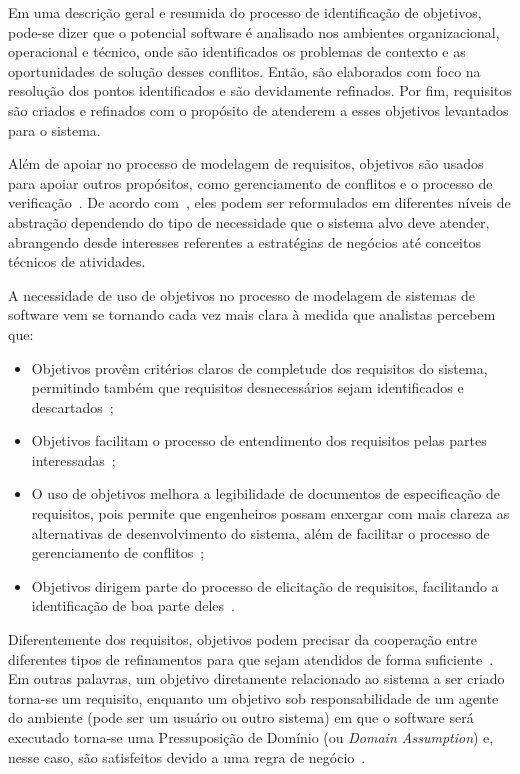 Em uma descrição geral e resumida do processo de identificação de objetivos, pode-se dizer que o potencial software é analisado nos ambientes organizacional, operacional e técnico, onde são identificados os problemas de contexto e as oportunidades de solução desses conflitos. Então, são elaborados com foco na resolução dos pontos identificados e são devidamente refinados. Por fim, requisitos são criados e refinados com o propósito de atenderem a esses objetivos levantados para o sistema. 


Além de apoiar no processo de modelagem de requisitos, objetivos são usados para apoiar outros propósitos, como gerenciamento de conflitos e o processo de verificação~\cite{lapouchnian2005goal}. De acordo com~, eles podem ser reformulados em diferentes níveis de abstração dependendo do tipo de necessidade que o sistema alvo deve atender, abrangendo desde interesses referentes a estratégias de negócios até conceitos técnicos de atividades.

A necessidade de uso de objetivos no processo de modelagem de sistemas de software vem se tornando cada vez mais clara à medida que analistas percebem que:
\begin{itemize}
	\item Objetivos provêm critérios claros de completude dos requisitos do sistema, permitindo também que requisitos desnecessários sejam identificados e descartados~\cite{van2001goal};
	
	\item Objetivos facilitam o processo de entendimento dos requisitos pelas partes interessadas~\cite{van2001goal};
	
	\item O uso de objetivos melhora a legibilidade de documentos de especificação de requisitos, pois permite que engenheiros possam enxergar com mais clareza as alternativas de desenvolvimento do sistema, além de facilitar o processo de gerenciamento de conflitos~\cite{van2001goal};
	
	\item Objetivos dirigem parte do processo de elicitação de requisitos, facilitando a identificação de boa parte deles~\cite{lapouchnian2005goal}.	
\end{itemize}

Diferentemente dos requisitos, objetivos podem precisar da cooperação entre diferentes tipos de refinamentos para que sejam atendidos de forma suficiente~\cite{dardenne1993goal}. Em outras palavras, um objetivo diretamente relacionado ao sistema a ser criado torna-se um requisito, enquanto um objetivo sob responsabilidade de um agente  do ambiente (pode ser um usuário ou outro sistema) em que o software será executado torna-se uma Pressuposição de Domínio (ou \textit{Domain Assumption}) e, nesse caso, são satisfeitos devido a uma regra de negócio~\cite{van2001goal, van1998managing}.

